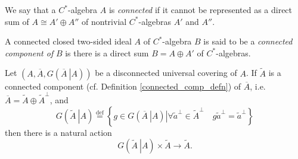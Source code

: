 \documentclass{beamer}
\theoremstyle{plain}
\newcommand{\be}{\begin{equation}}
\newcommand{\ee}{\end{equation}}
\newcommand{\bydef}{\stackrel{\mathrm{def}}{=}}
\begin{document}
\begin{frame}
\begin{definition}\label{connected_c_a_defn}
	We say that a $C^*$-algebra $A$ is \textit{connected} if it cannot be represented as a direct sum of $A \cong A' \oplus A''$ of nontrivial $C^*$-algebras $A'$ and $A''$.
	
\end{definition}
\begin{definition}\label{connected_comp_defn}
	A connected closed two-sided ideal $A$ of  $C^*$-algebra $B$ is said to be a \textit{connected component of}  $B$ is there is a direct sum $B = A \oplus A'$ of $C^*$-algebras.
\end{definition}
Let $\left(A, \overline{A}, G\left(\left.\overline{A}~\right| A\right)\right)$ be a  disconnected universal covering of $A$. If $\widetilde A$ is a connected component (cf. Definition \ref{connected_comp_defn}) of $\overline{A}$, i.e. $\overline{A} = \widetilde A \oplus \widetilde A^\perp$, and
\be\label{infinite_covering_transformation_group_eqn}
G\left(\left.\widetilde{A}~\right| A\right)\bydef 
\left\{\left. g \in  G\left(\left.\overline{A}~\right| A\right)\right| \forall \widetilde a^\perp \in \widetilde A^\perp \quad g \widetilde a^\perp= \widetilde a^\perp\right\}
\ee
then there is a natural action
\be\label{gta_act_eqn}
G\left(\left.\widetilde{A}~\right| A\right)\times \widetilde{A} \to \widetilde{A}.
\ee
\end{frame}
\end{document}

